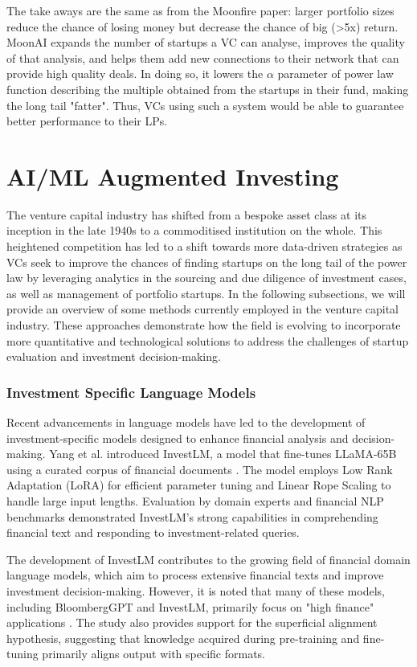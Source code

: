 \documentclass[a4paper, oneside]{discothesis}
\begin{document}
The take aways are the same as from the Moonfire paper: larger portfolio sizes reduce the chance of losing money but decrease the chance of big (>5x) return. MoonAI expands the number of startups a VC can analyse, improves the quality of that analysis, and helps them add new connections to their network that can provide high quality deals. In doing so, it lowers the $\alpha$ parameter of power law function describing the multiple obtained from the startups in their fund, making the long tail "fatter". Thus, VCs using such a system would be able to guarantee better performance to their LPs. 

\pagebreak


\section{AI/ML Augmented Investing}
The venture capital industry has shifted from a bespoke asset class at its inception in the late 1940s to a commoditised institution on the whole. This heightened competition has led to a shift towards more data-driven strategies as VCs seek to improve the chances of finding startups on the long tail of the power law by leveraging analytics in the sourcing and due diligence of investment cases, as well as management of portfolio startups. In the following subsections, we will provide an overview of some methods currently employed in the venture capital industry. These approaches demonstrate how the field is evolving to incorporate more quantitative and technological solutions to address the challenges of startup evaluation and investment decision-making.

\subsubsection{Investment Specific Language Models}
Recent advancements in language models have led to the development of investment-specific models designed to enhance financial analysis and decision-making. Yang et al. introduced InvestLM, a model that fine-tunes LLaMA-65B using a curated corpus of financial documents \cite{yang2023investlm}. The model employs Low Rank Adaptation (LoRA) for efficient parameter tuning and Linear Rope Scaling to handle large input lengths. Evaluation by domain experts and financial NLP benchmarks demonstrated InvestLM's strong capabilities in comprehending financial text and responding to investment-related queries.

The development of InvestLM contributes to the growing field of financial domain language models, which aim to process extensive financial texts and improve investment decision-making. However, it is noted that many of these models, including BloombergGPT and InvestLM, primarily focus on "high finance" applications \cite{yang2023investlm}. The study also provides support for the superficial alignment hypothesis, suggesting that knowledge acquired during pre-training and fine-tuning primarily aligns output with specific formats.
\end{document}
